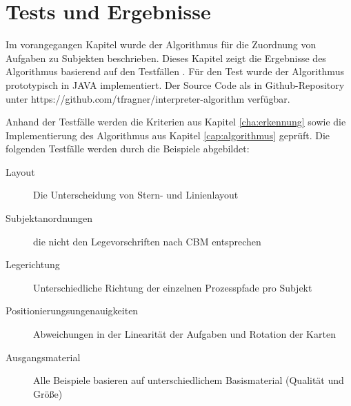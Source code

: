 %
%
% 
% 
% 


\chapter{Tests und Ergebnisse}
\label{chap:Ergebnisse}
Im vorangegangen Kapitel wurde der Algorithmus für die Zuordnung von Aufgaben zu Subjekten beschrieben. Dieses Kapitel zeigt die Ergebnisse des Algorithmus basierend auf den Testfällen \cite{max}. Für den Test wurde der Algorithmus prototypisch in JAVA implementiert. Der Source Code als in Github-Repository unter https://github.com/tfragner/interpreter-algorithm verfügbar.

Anhand der Testfälle werden die Kriterien aus Kapitel \ref{cha:erkennung} sowie die Implementierung des Algorithmus aus Kapitel \ref{cap:algorithmus} geprüft. Die folgenden Testfälle werden durch die Beispiele abgebildet: 
\begin{description}
	\item[Layout] Die Unterscheidung von Stern- und Linienlayout
	\item[Subjektanordnungen] die nicht den Legevorschriften nach CBM entsprechen
	\item[Legerichtung] Unterschiedliche Richtung der einzelnen Prozesspfade pro Subjekt
	\item[Positionierungsungenauigkeiten] Abweichungen in der Linearität der Aufgaben und Rotation der Karten
	\item[Ausgangsmaterial] Alle Beispiele basieren auf unterschiedlichem Basismaterial (Qualität und Größe)
\end{description}
\newpage
